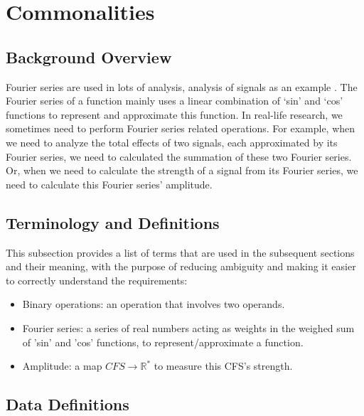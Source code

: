 \documentclass[12pt]{article}
\begin{document}
\section{Commonalities}\label{Sc:CA}

\subsection{Background Overview} \label{Sbsc:CA-Background}
Fourier series are used in lots of analysis, analysis of signals as an example 
\cite{papoulis1977signal}. The Fourier series of a function mainly uses 
a linear combination of `sin' and `cos' functions to represent and approximate 
this function. In real-life research, we sometimes need to perform Fourier 
series related operations. For example, when we need to analyze the total 
effects of two signals, each approximated by its Fourier series, 
we need to calculated the summation of these two Fourier series. 
Or, when we need to calculate the strength of a signal from its Fourier 
series, we need to calculate this Fourier series' amplitude.

\subsection{Terminology and Definitions}

This subsection provides a list of terms that are used in the subsequent
sections and their meaning, with the purpose of reducing ambiguity and making it
easier to correctly understand the requirements:

\begin{itemize}

\item Binary operations: an operation that involves two operands.
\item Fourier series: a series of real numbers acting as weights in the weighed
  sum of 'sin' and 'cos' functions, to represent/approximate a function.
\item Amplitude: a map $\mathit{CFS}\rightarrow \mathbb{R}^{*}$ to measure this CFS's strength.
\end{itemize}
  

\subsection{Data Definitions} \label{sec_datadef}
\end{document}
